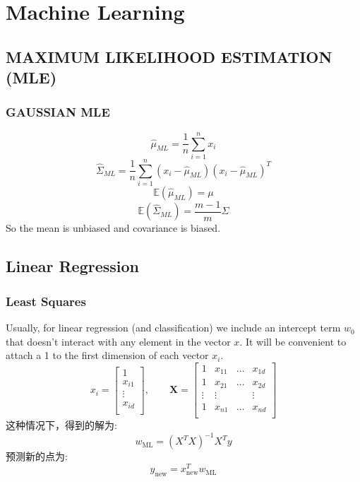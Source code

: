 \documentclass{article} 	%
\begin{document}
\newpage
\section{Machine Learning}
	\subsection{MAXIMUM LIKELIHOOD ESTIMATION (MLE)}
		\subsubsection{GAUSSIAN MLE}
			$$\hat{\mu}_{\scriptscriptstyle ML} = \frac{1}{n}\sum_{i=1}^nx_i$$
			$$\hat{\Sigma}_{\scriptscriptstyle ML} = \frac{1}{n}\sum_{i=1}^n(x_i - \hat{\mu}_{\scriptscriptstyle ML})(x_i - \hat{\mu}_{\scriptscriptstyle ML})^T$$
			$$\mathbb{E}(\hat{\mu}_{\scriptscriptstyle ML}) = \mu$$
			$$\mathbb{E}(\hat{\Sigma}_{\scriptscriptstyle ML}) = \frac{m-1}{m}\Sigma$$
			So the mean is unbiased and covariance is biased.
	\subsection{Linear Regression}
		\subsubsection{Least Squares}
			Usually, for linear regression (and classification) we include an intercept term $w_0$ that doesn’t interact with any element in the vector $x$. It will be 
			convenient to attach a 1 to the first dimension of each vector $x_i$.
			\[
			x_i = \left [
				\begin{array}{c}
				1\\
				x_{i1}\\
				\vdots\\
				x_{id}\\
				\end{array}
				\right ]
			, \qquad
			\mathbf{X} = \left [
					    \begin{array}{cccc}
					    1 &x_{11}& \ldots & x_{1d}\\
					    1 &x_{21}& \ldots & x_{2d}\\
					    \vdots &\vdots&  & \vdots\\
					    1 &x_{n1}& \ldots & x_{nd}\\
					    \end{array}
					    \right]
			\]
			这种情况下，得到的解为:
			\[
			w_{\scriptscriptstyle \mathrm{ML}} = (X^TX)^{-1}X^Ty
			\]
			预测新的点为:
			$$y_{\scriptscriptstyle\mathrm{new}} = x_{\scriptscriptstyle\mathrm{new}}^Tw_{\scriptscriptstyle \mathrm{ML}} $$
			
\end{document}
